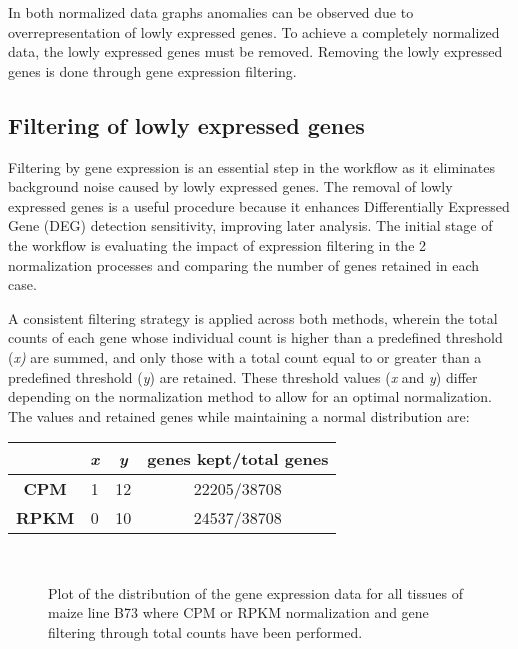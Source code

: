 \documentclass[
]{article}
\begin{document}
In both normalized data graphs anomalies can be observed due to
overrepresentation of lowly expressed genes. To achieve a completely
normalized data, the lowly expressed genes must be removed. Removing the
lowly expressed genes is done through gene expression filtering.

\hypertarget{filtering-of-lowly-expressed-genes}{%
\subsection{Filtering of lowly expressed
genes}\label{filtering-of-lowly-expressed-genes}}

Filtering by gene expression is an essential step in the workflow as it
eliminates background noise caused by lowly expressed genes. The removal
of lowly expressed genes is a useful procedure because it enhances
Differentially Expressed Gene (DEG) detection sensitivity, improving
later analysis. The initial stage of the workflow is evaluating the
impact of expression filtering in the 2 normalization processes and
comparing the number of genes retained in each case.

A consistent filtering strategy is applied across both methods, wherein
the total counts of each gene whose individual count is higher than a
predefined threshold (\emph{x)} are summed, and only those with a total
count equal to or greater than a predefined threshold (\emph{y}) are
retained. These threshold values (\emph{x} and \emph{y}) differ
depending on the normalization method to allow for an optimal
normalization. The values and retained genes while maintaining a normal
distribution are:

\begin{longtable}[]{@{}c c c c@{}}
\toprule
\textbf{} & \emph{\textbf{x}} & \emph{\textbf{y}} & \textbf{genes kept/total genes} \tabularnewline
\midrule
\endhead
\textbf{CPM} & 1 & 12 & 22205/38708 \tabularnewline
\textbf{RPKM} & 0 & 10 & 24537/38708 \tabularnewline
\bottomrule
\end{longtable}


\begin{figure}[H]
  \centering
  
  	 \\
  	
  \caption[Filter TC B73 distribution]{\small Plot of the distribution of the gene expression data for all tissues of maize line 
  B73 where CPM or RPKM normalization and gene filtering through total counts have been performed.} %
  \label{fig:TCfilter_Dis}
\end{figure}
\end{document}

